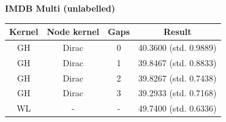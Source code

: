 \documentclass{article}
\begin{document}
\textbf{IMDB Multi (unlabelled)}\\
\begin{minipage}{0.6\linewidth}
	\hspace*{-1in}

	\label{fig:imdb_multi_unlabelled}
\end{minipage}
\begin{minipage}[c]{0.5\linewidth}	
	\centering
	\begin{tabular}{c|c|c|c}
		Kernel & Node kernel & Gaps & Result\\
		\hline
		GH & Dirac & 0 & 40.3600 (std. 0.9889) \\
		GH & Dirac & 1 & 39.8467 (std. 0.8833) \\
		GH & Dirac & 2 & 39.8267 (std. 0.7438) \\
		GH & Dirac & 3 & 39.2933 (std. 0.7168) \\
		WL & - & - & 49.7400 (std. 0.6336)
	\end{tabular}
	\label{table:imdb_multi_unlabelled}
\end{minipage}
\end{document}
